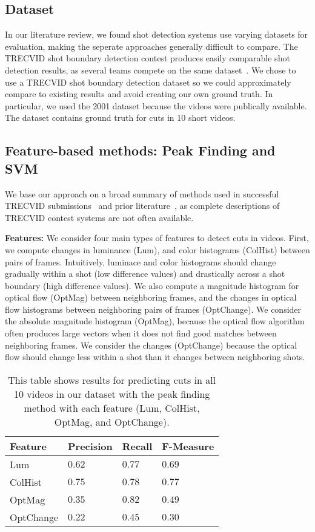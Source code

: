 \subsection*{Dataset}
In our literature review, we found shot detection systems use varying datasets for evaluation, making the seperate approaches generally difficult to compare. The TRECVID shot boundary detection contest produces easily comparable shot detection results, as several teams compete on the same dataset~\cite{smeaton_video_2010}. We chose to use a TRECVID shot boundary detection dataset so we could approximately compare to existing results and avoid creating our own ground truth. In particular, we used the 2001 dataset because the videos were publically available. The dataset contains ground truth for cuts in 10 short videos.

\subsection*{Feature-based methods: Peak Finding and SVM}
We base our approach on a broad summary of methods used in successful TRECVID submissions~\cite{smeaton_video_2010} and prior literature~\cite{boreczky1996comparison}, as complete descriptions of TRECVID contest systems are not often available. 

\textbf{Features:} We consider four main types of features to detect cuts in videos. First, we compute changes in luminance (Lum), and color histograms (ColHist) between pairs of frames. Intuitively, luminace and color histograms should change gradually within a shot (low difference values) and drastically across a shot boundary (high difference values). We also compute a magnitude histogram for optical flow (OptMag) between neighboring frames, and the changes in optical flow histograms between neighboring pairs of frames (OptChange). We consider the absolute magnitude histogram (OptMag), because the optical flow algorithm often produces large vectors when it does not find good matches between neighboring frames. We consider the changes (OptChange) because the optical flow should change less within a shot than it changes between neighboring shots.
\\

\begin{table}[h!]
  \begin{center}
  	\small{
	\begin{tabular}{l|lll}
	Feature   & Precision  & Recall     & F-Measure  \\ \hline
	Lum       & $0.62$ & $0.77$ & $0.69 $ \\
	ColHist   & $0.75$ & $0.78$ & $0.77$ \\
	OptMag    & $0.35$ & $0.82$ & $0.49$ \\
	OptChange & $0.22$ & $0.45$ & $0.30$ \\ \hline
	\end{tabular}
	}
  \end{center}
  \label{table:peakresults}
  \caption{This table shows results for predicting cuts in all 10 videos in our dataset with the peak finding method with each feature (Lum, ColHist, OptMag, and OptChange).}
\end{table} 

